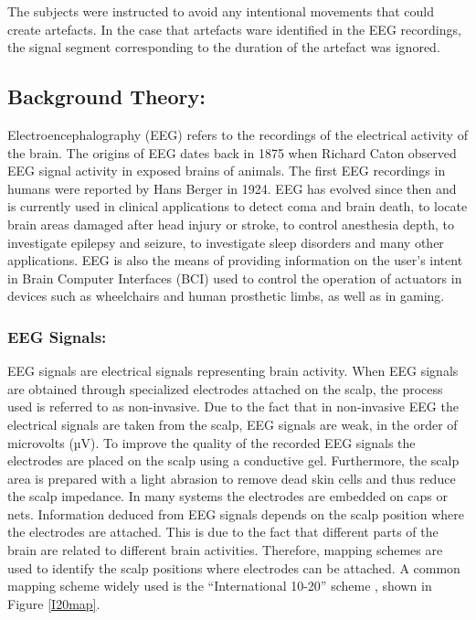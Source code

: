 The subjects were instructed to avoid any intentional movements that could create artefacts. In the case that artefacts ware identified in the EEG recordings, the signal segment corresponding to the duration of the artefact was ignored.
   
\subsection{\bf{Background Theory:}}
Electroencephalography (EEG) refers to the recordings of the electrical activity of the brain. The origins of EEG dates back in 1875 when Richard Caton observed EEG signal activity in exposed brains of animals. The first EEG recordings in humans were reported by Hans Berger in 1924. EEG has evolved since then and is currently used in clinical applications to detect coma and brain death, to locate brain areas damaged after head injury or stroke, to control anesthesia depth, to investigate epilepsy and seizure, to investigate sleep disorders and many other applications. EEG is also the means of providing information on the user’s intent in Brain Computer Interfaces (BCI) used to control the operation of actuators in devices such as wheelchairs and human prosthetic limbs, as well as in gaming. 

\subsubsection{\bf{EEG Signals:}}
EEG signals are electrical signals representing brain activity. When EEG signals are obtained through specialized electrodes attached on the scalp, the process used is referred to as non-invasive. Due to the fact that in non-invasive EEG the electrical signals are taken from the scalp, EEG signals are weak, in the order of microvolts (µV). To improve the quality of the recorded EEG signals the electrodes are placed on the scalp using a conductive gel. Furthermore, the scalp area is prepared with a light abrasion to remove dead skin cells and thus reduce the scalp impedance. In many systems the electrodes are embedded on caps or nets. 
Information deduced from EEG signals depends on the scalp position where the electrodes are attached. This is due to the fact that different parts of the brain are related to different brain activities. Therefore, mapping schemes are used to identify the scalp positions where electrodes can be attached. A common mapping scheme widely used is the “International 10-20” scheme \citep{Towle1993}, shown in Figure \ref{I20map}. 


